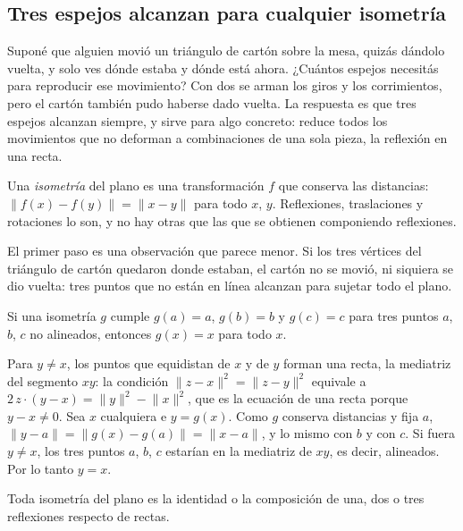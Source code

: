 \subsection{Tres espejos alcanzan para cualquier isometría}\label{sec:tres-espejos}

Suponé que alguien movió un triángulo de cartón sobre la mesa, quizás dándolo vuelta, y solo
ves dónde estaba y dónde está ahora. ¿Cuántos espejos necesitás para reproducir ese movimiento?
Con dos se arman los giros y los corrimientos, pero el cartón también pudo haberse dado vuelta.
La respuesta es que tres espejos alcanzan siempre, y sirve para algo concreto: reduce todos los
movimientos que no deforman a combinaciones de una sola pieza, la reflexión en una recta.

Una \emph{isometría} del plano es una transformación \(f\) que conserva las distancias:
\(\lVert f(x)-f(y)\rVert=\lVert x-y\rVert\) para todo \(x\), \(y\). Reflexiones, traslaciones y
rotaciones lo son, y no hay otras que las que se obtienen componiendo reflexiones.

El primer paso es una observación que parece menor. Si los tres vértices del triángulo de
cartón quedaron donde estaban, el cartón no se movió, ni siquiera se dio vuelta: tres puntos que
no están en línea alcanzan para sujetar todo el plano.

\begin{proposicion}\label{prop:isometria-tres-fijos}
Si una isometría \(g\) cumple \(g(a)=a\), \(g(b)=b\) y \(g(c)=c\) para tres puntos \(a\),
\(b\), \(c\) no alineados, entonces \(g(x)=x\) para todo \(x\).
\end{proposicion}

\begin{demostracion}
Para \(y\neq x\), los puntos que equidistan de \(x\) y de \(y\) forman una recta, la mediatriz
del segmento \(xy\): la condición \(\lVert z-x\rVert^2=\lVert z-y\rVert^2\) equivale a
\(2\,z\cdot(y-x)=\lVert y\rVert^2-\lVert x\rVert^2\), que es la ecuación de una recta porque
\(y-x\neq0\). Sea \(x\) cualquiera e \(y=g(x)\). Como \(g\) conserva distancias y fija \(a\),
\(\lVert y-a\rVert=\lVert g(x)-g(a)\rVert=\lVert x-a\rVert\), y lo mismo con \(b\) y con
\(c\). Si fuera \(y\neq x\), los tres puntos \(a\), \(b\), \(c\) estarían en la mediatriz de
\(xy\), es decir, alineados. Por lo tanto \(y=x\).
\end{demostracion}

\begin{teorema}\label{teo:tres-reflexiones}
Toda isometría del plano es la identidad o la composición de una, dos o tres reflexiones
respecto de rectas.
\end{teorema}


